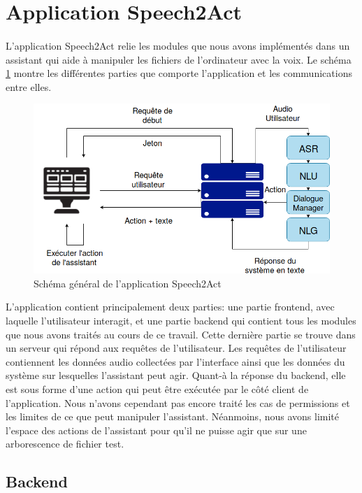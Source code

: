 \section{Application Speech2Act}
\paragraph{}L'application Speech2Act relie les modules que nous avons implémentés dans un assistant qui aide à manipuler les fichiers de l'ordinateur avec la voix. Le schéma \ref{schema_app} montre les différentes parties que comporte l'application et les communications entre elles.
\begin{figure}[H] 
	\centering
	\includegraphics[width=0.95\linewidth]{images/Realisation/schema_app.png}
	\caption{Schéma général de l'application Speech2Act}\label{schema_app}
\end{figure}
\par L'application contient principalement deux parties: une partie frontend, avec laquelle l'utilisateur interagit, et une partie backend qui contient tous les modules que nous avons traités au cours de ce travail. Cette dernière partie se trouve dans un serveur qui répond aux requêtes de l'utilisateur. Les requêtes de l'utilisateur contiennent les données audio collectées par l'interface ainsi que les données du système sur lesquelles l'assistant peut agir. Quant-à la réponse du backend, elle est sous forme d'une action qui peut être exécutée par le côté client de l'application. Nous n'avons cependant pas encore traité les cas de permissions et les limites de ce que peut manipuler l'assistant. Néanmoins, nous avons limité l'espace des actions de l'assistant pour qu'il ne puisse agir que sur une arborescence de fichier test.
\subsection{Backend}
